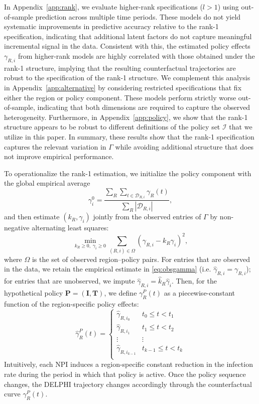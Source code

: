 \documentclass[msom,blindrev]{informs3} %
\begin{document}
{In Appendix~\ref{app:rank}, we evaluate higher-rank specifications ($l>1$) using out-of-sample prediction across multiple time periods. These models do not yield systematic improvements in predictive accuracy relative to the rank-1 specification, indicating that additional latent factors do not capture meaningful incremental signal in the data. Consistent with this, the estimated policy effects $\gamma_{R,i}$ from higher-rank models are highly correlated with those obtained under the rank-1 structure, implying that the resulting counterfactual trajectories are robust to the specification of the rank-1 structure. We complement this analysis in Appendix~\ref{app:alternative} by considering restricted specifications that fix either the region or policy component. These models perform strictly worse out-of-sample, indicating that both dimensions are required to capture the observed heterogeneity. Furthermore, in Appendix~\ref{app:policy}, we show that the rank-1 structure appears to be robust to different definitions of the policy set $\mathcal{I}$ that we utilize in this paper. In summary, these results show that the rank-1 specification captures the relevant variation in $\Gamma$ while avoiding additional structure that does not improve empirical performance.

To operationalize the rank-1 estimation, we initialize the policy component with the global empirical average
\[
    \gamma_i^0 = \frac{\sum_{R} \sum_{t \in \mathcal{D}_{R,i}} \gamma_R(t)}{\sum_{R} |\mathcal{D}_{R,i}|},
\]
and then estimate $(k_R,\gamma_i)$ jointly from the observed entries of $\Gamma$ by non-negative alternating least squares:
\begin{equation}
    \min_{k_R \ge 0,\; \gamma_i \ge 0} \sum_{(R,i)\in\Omega} \left(\gamma_{R,i} - k_R \gamma_i\right)^2,
\end{equation}
where $\Omega$ is the set of observed region--policy pairs. For entries that are observed in the data, we retain the empirical estimate in \eqref{eq:obsgamma} (i.e.  $\hat{\gamma}_{R,i} = \gamma_{R,i}$); for entries that are unobserved, we impute $
    \hat{\gamma}_{R,i} = \hat{k}_R \hat{\gamma}_i$. Then, for the hypothetical policy $\bm{P}=(\bm{I},\bm{T})$, we define $\gamma_R^P(t)$ as a piecewise-constant function of the region-specific policy effects:
\begin{equation}
     \hat{\gamma}_R^P(t)=\begin{cases}
     \hat{\gamma}_{R,i_0} & t_0\leq t<t_1\\
     \hat{\gamma}_{R,i_1} & t_1\leq t<t_2\\ 
    \vdots & \vdots \\
    \hat{\gamma}_{R,i_{k-1}} & t_{k-1}\leq t<t_k\\ 
    \end{cases}
\end{equation}
Intuitively, each NPI induces a region-specific constant reduction in the infection rate during the period in which that policy is active. Once the policy sequence changes, the DELPHI trajectory changes accordingly through the counterfactual curve $\gamma_R^P(t)$.}
\end{document}

